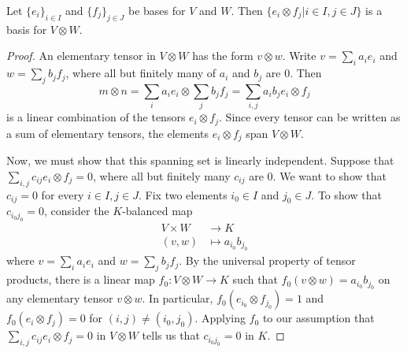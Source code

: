 \begin{prop}
Let $\{ e_i \}_{i \in I}$ and $\{ f_j \}_{j \in J}$ be bases for $V$ and $W$.  Then $\{ e_i \otimes f_j | i \in I, j \in J\}$  is a basis for $V \otimes W$.
\end{prop}
\begin{proof}
An elementary tensor in $V \otimes W$ has the form $v \otimes w$.  Write $v = \sum_i a_i e_i$ and $w = \sum_j b_j f_j$, where all but finitely many of $a_i$ and $b_j$ are 0.  Then 
\[ m \otimes n = \sum_i a_i e_i \otimes \sum_j b_j f_j  = \sum_{i,j} a_i b_j e_i \otimes f_j\]
is a linear combination of the tensors $e_i \otimes f_j$.  Since every tensor can be written as a sum of elementary tensors, the elements $e_i \otimes f_j$ span $V \otimes W$.

Now, we must show that this spanning set is linearly independent.  Suppose that $\sum_{i,j} c_{ij} e_i \otimes f_j = 0$, where all but finitely many $c_{ij}$ are 0.  We want to show that $c_{ij} = 0$ for every $i \in I, j \in J$. Fix two elements $ i_0 \in I$ and $j_0 \in J$.  To show that $c_{i_0 j_0} = 0$, consider the $K$-balanced map
\begin{align*}
V \times W &\to K \\
(v,w) &\mapsto a_{i_0} b_{j_0}
\end{align*}
 where $v = \sum_i a_i e_i$ and $w = \sum_j b_j f_j$. By the universal property of tensor products, there is a linear map $f_0 \colon V \otimes W \to K$ such that $f_0 (v \otimes w) = a_{i_0} b_{j_0}$ on any elementary tensor $v \otimes w$.  In particular, $f_0 (e_{i_0} \otimes f_{j_0}) = 1$ and  $f_0 (e_{i} \otimes f_{j}) = 0$ for $(i,j) \neq (i_0, j_0)$.  Applying $f_0$ to our assumption that $\sum_{i,j} c_{ij} e_i \otimes f_j = 0$ in $V \otimes W$ tells us that $c_{i_0 j_0} =0$ in $K$.  
\end{proof}

